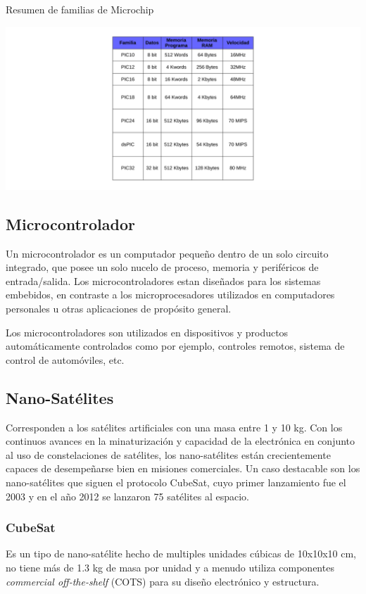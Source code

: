 \begin{table}[ht!]
	\caption{Resumen de familias de Microchip}\label{pic_list}
	\centering \includegraphics[width=\textwidth]{images/pic_list.pdf}
\end{table}
\subsection{Microcontrolador}
Un microcontrolador es un computador pequeño dentro de un solo circuito integrado, que posee un solo nucelo de proceso, memoria y perif\'ericos de entrada/salida. Los microcontroladores estan diseñados para los sistemas embebidos, en contraste a los microprocesadores utilizados en computadores personales u otras aplicaciones de propósito general.

Los microcontroladores son utilizados en dispositivos y productos automáticamente controlados como por ejemplo, controles remotos, sistema de control de automóviles, etc.

\subsection{Nano-Sat\'elites}
Corresponden a los sat\'elites artificiales con una masa entre 1 y 10 kg. Con los continuos avances en la minaturización y capacidad de la electrónica en conjunto al uso de constelaciones de sat\'elites, los nano-sat\'elites están crecientemente capaces de desempeñarse bien en misiones comerciales. Un caso destacable son los nano-sat\'elites que siguen el protocolo CubeSat, cuyo primer lanzamiento fue el 2003 y en el año 2012 se lanzaron 75 sat\'elites al espacio.

\subsubsection{CubeSat}
Es un tipo de nano-sat\'elite hecho de multiples unidades cúbicas de 10x10x10 cm, no tiene más de 1.3 kg de masa por unidad y a menudo utiliza componentes \textit{commercial off-the-shelf} (COTS) para su diseño electrónico y estructura.

